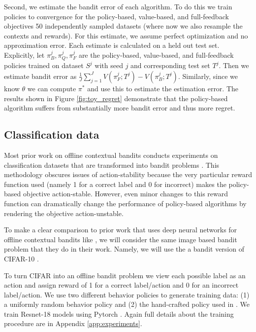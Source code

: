 Second, we estimate the bandit error of each algorithm. To do this we train policies to convergence for the policy-based, value-based, and full-feedback objectives 50 independently sampled datasets (where now we also resample the contexts and rewards). For this estimate, we assume perfect optimization and no approximation error. Each estimate is calculated on a held out test set. Explicitly, let $ \pi_B^j, \pi_Q^j, \pi_F^j$ are the policy-based, value-based, and full-feedback policies trained on dataset $ S^j$ with seed $ j$ and corresponding test set $ T^j$. Then we estimate bandit error as $ \frac{1}{J}\sum_{j=1}^J V(\pi_F^j;T^j) - V(\pi_B^j; T^j)$. Similarly, since we know $ \theta$ we can compute $ \pi^*$ and use this to estimate the estimation error. The results shown in Figure \ref{fig:toy_regret} demonstrate that the policy-based algorithm suffers from substantially more bandit error and thus more regret.


\subsection{Classification data}

Most prior work on offline contextual bandits conducts experiments on classification datasets that are transformed into bandit problems \cite{beygelzimer2009offset, dudik2011doubly, swaminathan2015counterfactual, swaminathan2015self, joachims2018deep, chen2019surrogate}. This methodology obscures issues of action-stability because the very particular reward function used (namely 1 for a correct label and 0 for incorrect) makes the policy-based objective action-stable. However, even minor changes to this reward function can dramatically change the performance of policy-based algorithms by rendering the objective action-unstable.

To make a clear comparison to prior work that uses deep neural networks for offline contextual bandits like \citet{joachims2018deep}, we will consider the same image based bandit problem that they do in their work. Namely, we will use the a bandit version of CIFAR-10 \citep{Krizhevsky09learningmultiple}.

To turn CIFAR into an offline bandit problem we view each possible label as an action and assign reward of 1 for a correct label/action and 0 for an incorrect label/action. We use two different behavior policies to generate training data: (1) a uniformly random behavior policy and (2) the hand-crafted policy used in \citep{joachims2018deep}. We train Resnet-18 \citep{he2016deep} models using Pytorch \citep{paszke2019pytorch}. Again full details about the training procedure are in Appendix \ref{app:experiments}.

